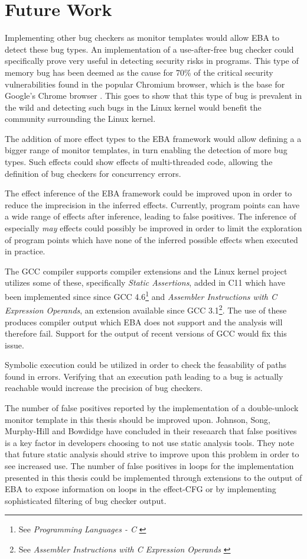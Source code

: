 \section{Future Work}

Implementing other bug checkers as monitor templates would allow EBA to detect these bug types. An implementation of a use-after-free bug checker could specifically prove very useful in detecting security risks in programs. This type of memory bug has been deemed as the cause for 70\% of the critical security vulnerabilities found in the popular Chromium browser, which is the base for Google's Chrome browser \cite{google-use-after-free}. This goes to show that this type of bug is prevalent in the wild and detecting such bugs in the Linux kernel would benefit the community surrounding the Linux kernel.

\newpar The addition of more effect types to the EBA framework would allow defining a a bigger range of monitor templates, in turn enabling the detection of more bug types. Such effects could show effects of multi-threaded code, allowing the definition of bug checkers for concurrency errors. 

\newpar The effect inference of the EBA framework could be improved upon in order to reduce the imprecision in the inferred effects. Currently, program points can have a wide range of effects after inference, leading to false positives. The inference of especially \textit{may} effects could possibly be improved in order to limit the exploration of program points which have none of the inferred possible effects when executed in practice. 

\newpar The GCC compiler supports compiler extensions and the Linux kernel project utilizes some of these, specifically \textit{Static Assertions}, added in C11 which have been implemented since since GCC 4.6\footnote{See \textit{Programming Languages - C} \cite{ISO:2011:IIIb}} and \textit{Assembler Instructions with C Expression Operands}, an extension available since GCC 3.1\footnote{See \textit{Assembler Instructions with C Expression Operands} \cite{GCC:3.1}}. The use of these produces compiler output which EBA does not support and the analysis will therefore fail. Support for the output of recent versions of GCC would fix this issue. 

\newpar Symbolic execution could be utilized in order to check the feasability of paths found in errors. Verifying that an execution path leading to a bug is actually reachable would increase the precision of bug checkers.  

\newpar The number of false positives reported by the implementation of a double-unlock monitor template in this thesis should be improved upon. Johnson, Song, Murphy-Hill and Bowdidge \cite{false-positives} have concluded in their reseaarch that false positives is a key factor in developers choosing to not use static analysis tools. They note that future static analysis should strive to improve upon this problem in order to see increased use. The number of false positives in loops for the implementation presented in this thesis could be implemented through extensions to the output of EBA to expose information on loops in the effect-CFG or by implementing sophisticated filtering of bug checker output.